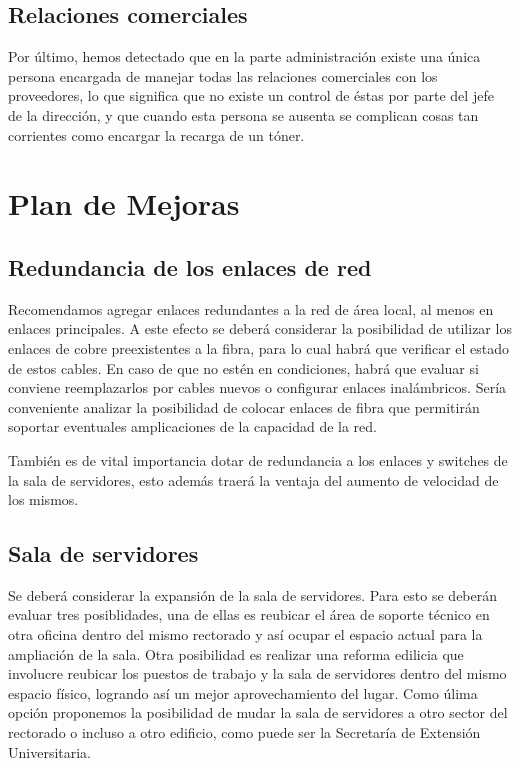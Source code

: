 \documentclass[a4paper,11pt,oneside]{article}
\begin{document}
\subsection*{Relaciones comerciales}
Por último, hemos detectado que en la parte administración existe una
única persona encargada de manejar todas las relaciones comerciales
con los proveedores, lo que significa que no existe un control de
éstas por parte del jefe de la dirección, y que cuando esta persona se
ausenta se complican cosas tan corrientes como encargar la recarga de
un tóner.
\newpage
\section{Plan de Mejoras}
\subsection*{Redundancia de los enlaces de red}
Recomendamos agregar enlaces redundantes a la red de área local, al
menos en enlaces principales. A este efecto se deberá considerar la
posibilidad de utilizar los enlaces de cobre preexistentes a la fibra,
para lo cual habrá que verificar el estado de estos cables. En caso de
que no estén en condiciones, habrá que evaluar si conviene
reemplazarlos por cables nuevos o configurar enlaces
inalámbricos. Sería conveniente analizar la posibilidad de colocar
enlaces de fibra que permitirán soportar eventuales amplicaciones de
la capacidad de la red.

También es de vital importancia dotar de redundancia a los enlaces y
switches de la sala de servidores, esto además traerá la ventaja del
aumento de velocidad de los mismos.
%
\subsection*{Sala de servidores}
Se deberá considerar la expansión de la sala de servidores. Para esto
se deberán evaluar tres posiblidades, una de ellas es reubicar el área
de soporte técnico en otra oficina dentro del mismo rectorado y así
ocupar el espacio actual para la ampliación de la sala.
Otra posibilidad es realizar una reforma edilicia que involucre
reubicar los puestos de trabajo y la sala de servidores dentro del
mismo espacio físico, logrando así un mejor aprovechamiento del lugar.
Como úlima opción proponemos la posibilidad de mudar la sala de
servidores a otro sector del rectorado o incluso a otro edificio, como
puede ser la Secretaría de Extensión Universitaria.
\end{document}
